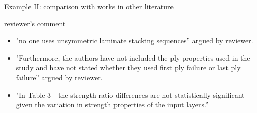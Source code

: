 \documentclass{beamer}
\begin{document}
\begin{frame}{Example II: comparison with works in other literature}
\begin{table}
	\normalsize
	\caption{Comparison with the results of DSA}
	\label{tab:comparision}
	\centering
\end{table}
\end{frame}

\begin{frame}{reviewer's comment}
	\begin{itemize}
		\item "no one uses unsymmetric laminate stacking sequences” argued by
			reviewer. 
		\item "Furthermore, the authors have not included the ply properties
			used in the study and have not stated whether they used first ply
			failure or last ply failure” argued by reviewer.
	   \item "In Table 3 - the strength ratio differences are not statistically
		   significant given the variation in strength properties of the input
		   layers.”  
	\end{itemize}
\end{frame}
\end{document}
